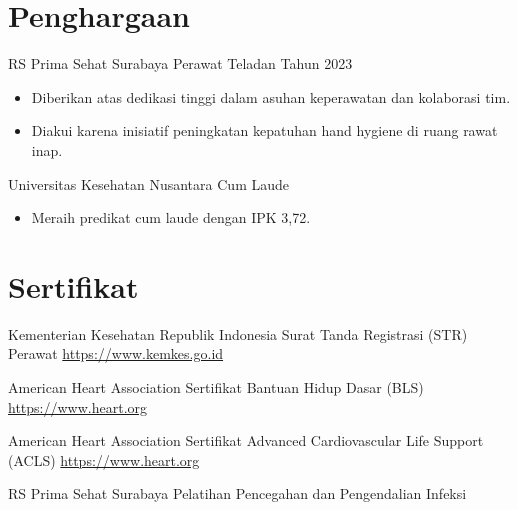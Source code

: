 \documentclass[a4paper, serif, 10pt]{moderncv}
\begin{document}
\section{Penghargaan}

        {RS Prima Sehat Surabaya}
        {Perawat Teladan Tahun 2023}
        {}
        {}
        {\begin{itemize}
\item Diberikan atas dedikasi tinggi dalam asuhan keperawatan dan kolaborasi tim.
\item Diakui karena inisiatif peningkatan kepatuhan hand hygiene di ruang rawat inap.
\end{itemize}}

        {Universitas Kesehatan Nusantara}
        {Cum Laude}
        {}
        {}
        {\begin{itemize}
\item Meraih predikat cum laude dengan IPK 3,72.
\end{itemize}}
\section{Sertifikat}

        {Kementerian Kesehatan Republik Indonesia}
        {Surat Tanda Registrasi (STR) Perawat}
        {\url{https://www.kemkes.go.id}}
        {}
        {}

        {American Heart Association}
        {Sertifikat Bantuan Hidup Dasar (BLS)}
        {\url{https://www.heart.org}}
        {}
        {}

        {American Heart Association}
        {Sertifikat Advanced Cardiovascular Life Support (ACLS)}
        {\url{https://www.heart.org}}
        {}
        {}

        {RS Prima Sehat Surabaya}
        {Pelatihan Pencegahan dan Pengendalian Infeksi}
        {}
        {}
        {}
\end{document}
